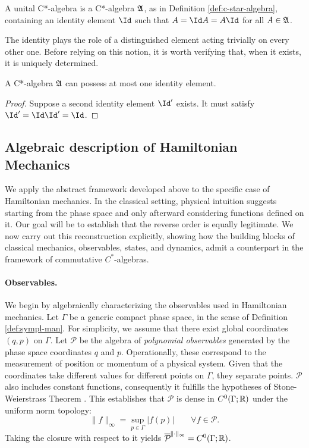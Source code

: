 	\begin{definition}\label{def:unital-c-star-algebra}
		A unital C*-algebra is a C*-algebra $\mathfrak{A}$, as in Definition \ref{def:c-star-algebra}, containing an identity element $\Id$ such that $A = \Id A = A \Id$ for all $A \in \mathfrak{A}$.
	\end{definition}
	
	The identity plays the role of a distinguished element acting trivially on every other one. Before relying on this notion, it is worth verifying that, when it exists, it is uniquely determined.
	
	\begin{proposition}
		A C*-algebra $\mathfrak{A}$ can possess at most one identity element.
	\end{proposition}
	
	\begin{proof}
		Suppose a second identity element $\Id'$ exists. It must satisfy $\Id' = \Id \Id' = \Id$.
	\end{proof}
	
	\subsection*{Algebraic description of Hamiltonian Mechanics}
	We apply the abstract framework developed above to the specific case of Hamiltonian mechanics. In the classical setting, physical intuition suggests starting from the phase space and only afterward considering functions defined on it. Our goal will be to establish that the reverse order is equally legitimate. We now carry out this reconstruction explicitly, showing how the building blocks of classical mechanics, observables, states, and dynamics, admit a counterpart in the framework of commutative $C^*$-algebras.
	
	\smallskip
	\paragraph{Observables.}
	
	We begin by algebraically characterizing the observables used in Hamiltonian mechanics. Let $\Gamma$ be a generic compact phase space, in the sense of Definition \ref{def:sympl-man}. For simplicity, we assume that there exist global coordinates $(q,p)$ on $\Gamma$. Let $\mathcal{P}$ be the algebra of \emph{polynomial observables} generated by the phase space coordinates $q$ and $p$. Operationally, these correspond to the measurement of position or momentum of a physical system. Given that the coordinates take different values for different points on $\Gamma$, they separate points. $\mathcal{P}$ also includes constant functions, consequently it fulfills the hypotheses of Stone-Weierstrass Theorem \cite[Theorem IV.9]{reedMethodsModernMathematical2003}. This establishes that $\mathcal{P}$ is dense in $C^0(\Gamma; \mathbb{R})$ under the uniform norm topology:  \begin{equation}
		\| f \|_\infty = \sup_{p \in \Gamma} |f(p)| \qquad \forall f \in \mathcal{P}.\label{eq:sup-norm} 
	\end{equation} 
	Taking the closure with respect to it yields $\overline{\mathcal{P}}^{\| \cdot \|_\infty} = C^0(\Gamma; \R)$.  
	
